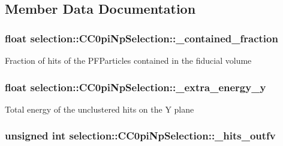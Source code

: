 \subsection{Member Data Documentation}
\hypertarget{classselection_1_1CC0piNpSelection_a8e7933222bce1424aee24bae8dcf4864}{
\subsubsection[{\-\_\-contained\-\_\-fraction}]{\setlength{\rightskip}{0pt plus 5cm}float selection\-::\-C\-C0pi\-Np\-Selection\-::\-\_\-contained\-\_\-fraction\hspace{0.3cm}{\ttfamily [private]}}}\label{classselection_1_1CC0piNpSelection_a8e7933222bce1424aee24bae8dcf4864}
Fraction of hits of the P\-F\-Particles contained in the fiducial volume \hypertarget{classselection_1_1CC0piNpSelection_a2e386c361ecc27d22ff2642e80a629e4}{
\subsubsection[{\-\_\-extra\-\_\-energy\-\_\-y}]{\setlength{\rightskip}{0pt plus 5cm}float selection\-::\-C\-C0pi\-Np\-Selection\-::\-\_\-extra\-\_\-energy\-\_\-y\hspace{0.3cm}{\ttfamily [private]}}}\label{classselection_1_1CC0piNpSelection_a2e386c361ecc27d22ff2642e80a629e4}
Total energy of the unclustered hits on the Y plane \hypertarget{classselection_1_1CC0piNpSelection_ac39ec79d190fb925f8d20b03cbeb0605}{
\subsubsection[{\-\_\-hits\-\_\-outfv}]{\setlength{\rightskip}{0pt plus 5cm}unsigned int selection\-::\-C\-C0pi\-Np\-Selection\-::\-\_\-hits\-\_\-outfv\hspace{0.3cm}{\ttfamily [private]}}}\label{classselection_1_1CC0piNpSelection_ac39ec79d190fb925f8d20b03cbeb0605}
